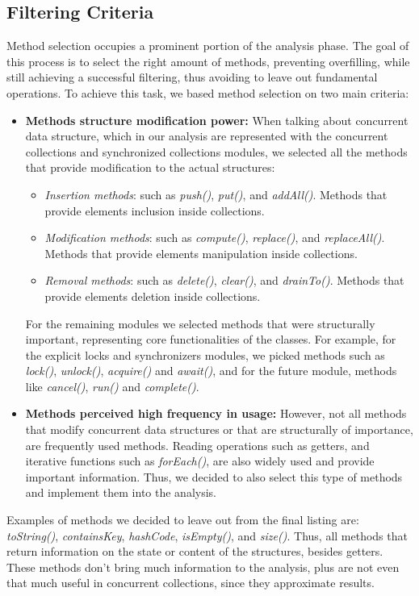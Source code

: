 \documentclass[]{usiinfthesis}
\begin{document}
\subsection{Filtering Criteria}
Method selection occupies a prominent portion of the analysis phase. The goal of this process is to select the right amount of methods, preventing overfilling, while still achieving a successful filtering, thus avoiding to leave out fundamental operations. To achieve this task, we based method selection on two main criteria:
 \begin{itemize}
    \item \textbf{Methods structure modification power: } When talking about concurrent data structure, which in our analysis are represented with the concurrent collections and synchronized collections modules, we selected all the methods that provide modification to the actual structures:
    \begin{itemize}
        \item \textit{Insertion methods}: such as \textit{push()}, \textit{put()}, and \textit{addAll()}. Methods that provide elements inclusion inside collections.
        \item \textit{Modification methods}: such as \textit{compute()}, \textit{replace()}, and \textit{replaceAll()}. Methods that provide elements manipulation inside collections.
        \item \textit{Removal methods}: such as \textit{delete()}, \textit{clear()}, and \textit{drainTo()}. Methods that provide elements deletion inside collections.
    \end{itemize}
    For the remaining modules we selected methods that were structurally important, representing core functionalities of the classes. For example, for the explicit locks and synchronizers modules, we picked methods such as \textit{lock()}, \textit{unlock()}, \textit{acquire()} and \textit{await()}, and for the future module, methods like \textit{cancel()}, \textit{run()} and \textit{complete()}. 
    
    \item \textbf{Methods perceived high frequency in usage: }However, not all methods that modify concurrent data structures or that are structurally of importance, are frequently used methods. Reading operations such as getters, and iterative functions such as \textit{forEach()}, are also widely used and provide important information. Thus, we decided to also select this type of methods and implement them into the analysis. 
 \end{itemize}
 \noindent
 Examples of methods we decided to leave out from the final listing are: \textit{toString()}, \textit{containsKey}, \textit{hashCode}, \textit{isEmpty()}, and \textit{size()}. Thus, all methods that return information on the state or content of the structures, besides getters. These methods don't bring much information to the analysis, plus are not even that much useful in concurrent collections, since they approximate results.
 
\end{document}
